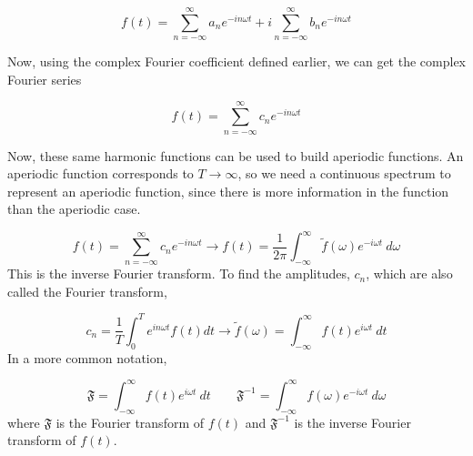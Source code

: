 \begin{equation}
    f(t) = \sum_{n=-\infty}^{\infty}a_ne^{-in\omega t} + i\sum_{n=-\infty}^{\infty}b_ne^{-in\omega t}
\end{equation}

Now, using the complex Fourier coefficient defined earlier, we can get the
complex Fourier series

\begin{equation}
    f(t)=\sum_{n=-\infty}^{\infty}c_ne^{-in\omega t}
\end{equation}

Now, these same harmonic functions can be used to build aperiodic functions. An
aperiodic function corresponds to $T\rightarrow \infty$, so we need a
continuous spectrum to represent an aperiodic function, since there is more
information in the function than the aperiodic case.

\begin{equation}
    f(t)=\sum_{n=-\infty}^{\infty}c_ne^{-in\omega t} \rightarrow
    f(t)=\frac{1}{2\pi}\int_{-\infty}^{\infty} \tilde{f}(\omega) e^{-i\omega t}~d\omega
\end{equation}
This is the inverse Fourier transform. To find the amplitudes, $c_n$, which are
also called the Fourier transform,

\begin{equation}
    c_n = \frac{1}{T}\int_0^Te^{in\omega t} f(t) dt \rightarrow
    \tilde{f}(\omega) =\int_{-\infty}^{\infty}f(t)e^{i\omega t}~dt
\end{equation}
In a more common notation,

\begin{equation}
    \mathfrak{F} =\int_{-\infty}^{\infty}f(t)e^{i\omega t}~dt
    \qquad
    \mathfrak{F}^{-1} =\int_{-\infty}^{\infty}f(\omega)e^{-i\omega t}~d\omega
\end{equation}
where $\mathfrak{F}$ is the Fourier transform of  $f(t)$ and
$\mathfrak{F}^{-1}$ is the inverse Fourier transform of $f(t)$.



